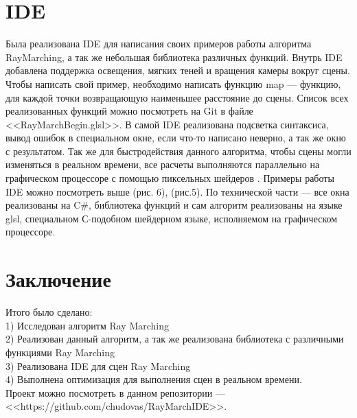 \documentclass[14pt]{matmex-diploma}
\begin{document}
\section{IDE}
Была реализована IDE для написания своих примеров работы алгоритма RayMarching, а так же небольшая библиотека различных функций. Внутрь IDE добавлена поддержка освещения,
мягких теней и вращения камеры вокруг сцены. Чтобы написать свой пример, необходимо написать функцию map --- функцию, для каждой точки возвращающую
наименьшее расстояние до сцены. Список всех реализованных функций можно посмотреть на Git в файле <<RayMarchBegin.glsl>>.
В самой IDE реализована подсветка синтаксиса, вывод ошибок в специальном окне, если что-то написано неверно, а так же окно с результатом.
Так же для быстродействия данного алгоритма, чтобы сцены могли изменяться в реальном времени, все расчеты выполняются параллельно на графическом процессоре с 
помощью пиксельных шейдеров \cite{wiki:shader}. Примеры работы IDE можно посмотреть выше (рис. 6), (рис.5).
По технической части --- все окна реализованы на C\#, библиотека функций и сам алгоритм реализованы на языке glsl, специальном С-подобном шейдерном языке, исполняемом
на графическом процессоре. 

\section*{Заключение}

Итого было сделано: \\
1) Исследован алгоритм Ray Marching \\
2) Реализован данный алгоритм, а так же реализована библиотека с различными функциями Ray Marching \\
3) Реализована IDE для сцен Ray Marching \\
4) Выполнена оптимизация для выполнения сцен в реальном времени. \\

Проект можно посмотреть в данном репозитории --- \\ <<https://github.com/chudovas/RayMarchIDE>>. 

\setmonofont[Mapping=tex-text]{CMU Typewriter Text}


\end{document}
